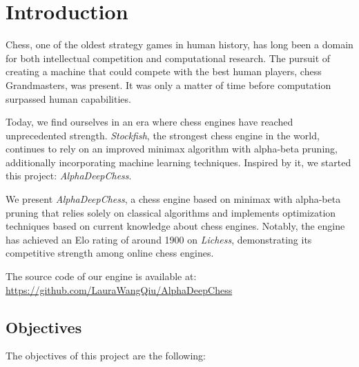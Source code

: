 \chapter{Introduction}\label{cap:introduction}
\renewcommand{\figurename}{Figure}

Chess, one of the oldest strategy games in human history, has long been a domain for both intellectual competition and computational research. The pursuit of creating a machine that could compete with the best human players, chess Grandmasters, was present. It was only a matter of time before computation surpassed human capabilities.

\vspace{1em}

\noindent Today, we find ourselves in an era where chess engines have reached unprecedented strength. \textit{Stockfish}, the strongest chess engine in the world, continues to rely on an improved minimax algorithm with alpha-beta pruning, additionally incorporating machine learning techniques. Inspired by it, we started this project: \textit{AlphaDeepChess}.

\vspace{1em}

\noindent We present \textit{AlphaDeepChess}, a chess engine based on minimax with alpha-beta pruning that relies solely on classical algorithms and implements optimization techniques based on current knowledge about chess engines. Notably, the engine has achieved an Elo rating of around 1900 on \textit{Lichess}, demonstrating its competitive strength among online chess engines.

\vspace{1em}

\noindent The source code of our engine is available at:\\
\url{https://github.com/LauraWangQiu/AlphaDeepChess}

\newpage

\section{Objectives}\label{sec:objectives}

\noindent The objectives of this project are the following:

